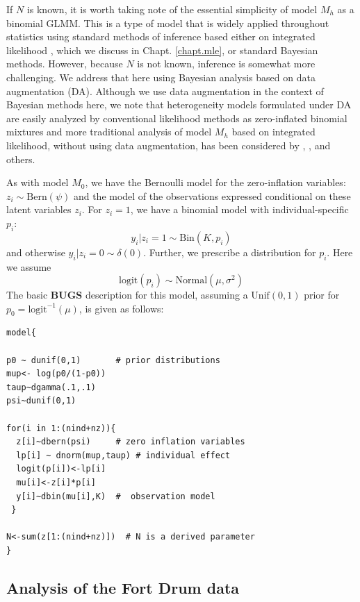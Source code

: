 If $N$ is known, it is worth taking note of the essential simplicity
of model $M_h$ as a binomial GLMM.  This is a type of model that is
widely applied throughout statistics using 
standard methods of inference based either on integrated likelihood
\citep{laird_ware:1982, berger_etal:1999}, which we discuss in
Chapt. \ref{chapt.mle}, or standard Bayesian
methods. However, because $N$ is not known, inference is somewhat more
challenging. We address that here using Bayesian analysis based on
data augmentation (DA). Although we use data augmentation in the context of
Bayesian methods here, we note that
heterogeneity models formulated under DA are easily analyzed by
conventional likelihood methods as zero-inflated binomial mixtures
\citep{royle:2006} and more traditional analysis of model $M_h$ based on
integrated likelihood, without using data augmentation, has been
considered by \citet{coull_agresti:1999}, \citet{dorazio_royle:2003},
and others.

As with model $M_{0}$, we have the Bernoulli model for the
zero-inflation variables: $z_{i} \sim \mbox{Bern}(\psi)$ and the model
of the observations expressed conditional on these latent variables
$z_{i}$. For $z_{i}=1$, we have a binomial model with
individual-specific $p_{i}$:
\[
y_{i}|{z_{i} \! = \! 1} \sim \mbox{Bin}(K,p_{i})
\]
and otherwise $y_{i} |{ z_{i} \! = \! 0} \sim \delta(0)$. Further, we
prescribe a distribution for $p_{i}$. Here we assume
\[
\mathrm{logit}(p_{i}) \sim \mbox{Normal}(\mu,\sigma^2)
\]
The basic {\bf BUGS} description for this model, assuming a
$\mbox{Unif}(0,1)$ prior for $p_{0} = \mbox{logit}^{-1}(\mu)$, is given
as follows:
{\small
\begin{verbatim}
model{

p0 ~ dunif(0,1)       # prior distributions
mup<- log(p0/(1-p0))
taup~dgamma(.1,.1)
psi~dunif(0,1)

for(i in 1:(nind+nz)){
  z[i]~dbern(psi)     # zero inflation variables
  lp[i] ~ dnorm(mup,taup) # individual effect
  logit(p[i])<-lp[i]
  mu[i]<-z[i]*p[i]
  y[i]~dbin(mu[i],K)  #  observation model
 }

N<-sum(z[1:(nind+nz)])  # N is a derived parameter
}
\end{verbatim}
}


\subsection{Analysis of the Fort Drum data}

